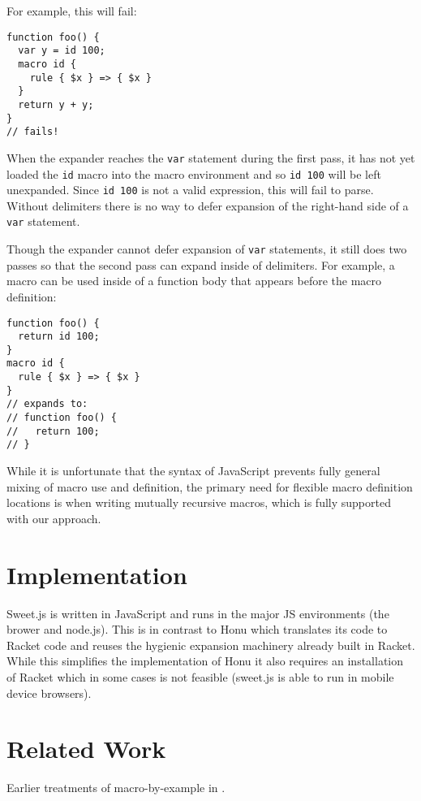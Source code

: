 \documentclass[preprint,10pt]{sigplanconf}
\begin{document}
For example, this will fail:

\begin{lstlisting}
function foo() {
  var y = id 100;
  macro id {
    rule { $x } => { $x }
  }
  return y + y;
}
// fails!
\end{lstlisting}
When the expander reaches the \lstinline!var! statement during the
first pass, it has not yet loaded the \lstinline!id! macro into the
macro environment and so \lstinline!id 100! will be left unexpanded.
Since \lstinline!id 100! is not a valid expression, this will fail to parse.
Without delimiters there is no way to defer expansion of the
right-hand side of a \lstinline!var! statement.

Though the expander cannot defer expansion of \lstinline!var!
statements, it still does two passes so that
the second pass can expand inside of delimiters. For example, a macro
can be used inside of a function body that appears before the macro definition:
\begin{lstlisting}
function foo() {
  return id 100;
}
macro id {
  rule { $x } => { $x }
}
// expands to:
// function foo() {
//   return 100;
// }
\end{lstlisting}

While it is unfortunate that the syntax of JavaScript prevents fully
general mixing of macro use and definition, the primary need for
flexible macro definition locations is when writing mutually recursive
macros, which is fully supported with our approach.

\section{Implementation}
\label{sec:implementation}

Sweet.js is written in JavaScript and runs in the major JS
environments (\ie the brower and node.js). This is in contrast to Honu
which translates its code to Racket code and reuses the hygienic
expansion machinery already built in Racket. While this simplifies
the implementation of Honu it also requires an installation of Racket
which in some cases is not feasible (\eg sweet.js is able to run in
mobile device browsers).


\section{Related Work}
\label{sec:related}

Earlier treatments of macro-by-example in \cite{Kohlbecker1987}.
\end{document}
